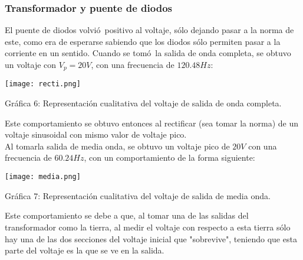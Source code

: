 \documentclass[11pt]{article}
\renewcommand{\=}[1]{\stackrel{#1}{=}} %
\theoremstyle{definition}
\theoremstyle{remark}
\begin{document}
\subsubsection*{Transformador y puente de diodos}
El puente de diodos volvi\'o\ positivo al voltaje, s\'olo dejando pasar a la norma de este, como era de esperarse sabiendo que los diodos s\'olo permiten pasar a la corriente en un sentido. Cuando se tom\'o\ la salida de onda completa, se obtuvo un voltaje con $V_p=20V$, con una frecuencia de $120.48Hz$:
\begin{center}
\texttt{[image: recti.png]}
\end{center} 
\begin{center}
Gr\'afica 6: Representaci\'on cualitativa del voltaje de salida de onda completa.
\end{center}
Este comportamiento se obtuvo entonces al rectificar (sea tomar la norma) de un voltaje sinusoidal con mismo valor de voltaje pico. \\
Al tomarla salida de media onda, se obtuvo un voltaje pico de $20V$ con una frecuencia de $60.24Hz$, con un comportamiento de la forma siguiente:
\begin{center}
\texttt{[image: media.png]}
\end{center} 
\begin{center}
Gr\'afica 7: Representaci\'on cualitativa del voltaje de salida de media onda.
\end{center}
Este comportamiento se debe a que, al tomar una de las salidas del transformador como la tierra, al medir el voltaje con respecto a esta tierra s\'olo hay una de las dos secciones del voltaje inicial que "sobrevive", teniendo que esta parte del voltaje es la que se ve en la salida.
\end{document}
